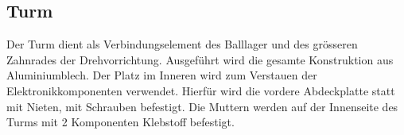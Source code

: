 \subsection{Turm}
Der Turm dient als Verbindungselement des Balllager und des grösseren 
Zahnrades der Drehvorrichtung. Ausgeführt wird die gesamte Konstruktion aus 
Aluminiumblech. Der Platz im Inneren wird zum Verstauen der 
Elektronikkomponenten verwendet. Hierfür wird die vordere Abdeckplatte statt mit Nieten, mit Schrauben befestigt. Die Muttern werden auf der Innenseite des Turms mit 2 Komponenten Klebstoff befestigt.